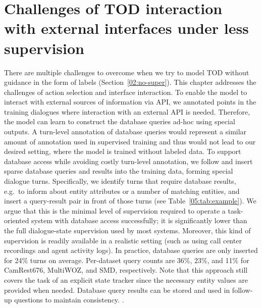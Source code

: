 \section{Challenges of TOD interaction with external interfaces under less supervision}
\label{05:sec:to-unsup}
There are multiple challenges to overcome when we try to model TOD without guidance in the form of labels (Section~\ref{02:no-super}).
This chapter addresses the challenges of action selection and interface interaction.
To enable the model to interact with external sources of information via API, we annotated points in the training dialogues where interaction with an external API is needed.
Therefore, the model can learn to construct the database queries ad-hoc using special outputs.
A turn-level annotation of database queries would represent a similar amount of annotation used in supervised training and thus would not lead to our desired setting, where the model is trained without labeled data.
To support database access while avoiding costly turn-level annotation, we follow \citet{bordes2016learning} and 
insert sparse database queries and results into the training data, forming special dialogue turns.
Specifically, we identify turns that require database results, e.g.\ to inform about entity attributes or a number of matching entities, and insert a query-result pair in front of those turns (see Table~\ref{05:tab:example}). We argue that this is the minimal level of supervision required to operate a task-oriented system with database access successfully; it is significantly lower than the full dialogue-state supervision used by most systems.
Moreover, this kind of supervision is readily available in a realistic setting (such as using call center recordings and agent activity logs).
In practice, database queries are only inserted for 24\% turns on average.
Per-dataset query counts are 36\%, 23\%, and 11\% for CamRest676, MultiWOZ, and SMD, respectively.
Note that this approach still covers the task of an explicit state tracker since the necessary entity values are provided when needed.
Database query results can be stored and used in follow-up questions to maintain consistency.
.
